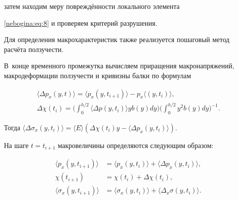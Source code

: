 затем находим меру повреждённости локального элемента

\eqref{nebogina:eq:8} и проверяем критерий разрушения.



Для определения макрохарактеристик также реализуется пошаговый метод расчёта ползучести. 

В~конце временного промежутка вычисляем приращения макронапряжений, макродеформации ползучести и кривизны балки по формулам

\begin{equation} \label{nebogina:eq:21}

\begin{array}{c}

\langle\Delta p_x (y,t)\rangle =\langle p_x ( y, t_{i+1} )\rangle

- p_x\langle ( y , t_i )\rangle, \\[2mm]

\displaystyle

\Delta \chi ( t_i ) = \biggl({ \int _0^{h/2} \langle \Delta p ( y, t_i )\rangle y b( y)

dy}\biggr) \biggl({\int _0^{h/2} y^2 b(y) dy}\biggr)^{-1}.

\end{array}

\end{equation}

Тогда  $\langle \Delta \sigma_x ( y, t_i )\rangle = \langle E \rangle ( \Delta \chi (t_i) y - \langle\Delta p_x ( y, t_i )\rangle )$.



На шаге $t=t_{i+1}$  макровеличины определяются следующим образом:

\begin{equation}\label{nebogina:eq:22}

\begin{aligned}

\langle p_x( y, t_{i+1} )\rangle &= \langle p_x( y, t_i )\rangle + \langle\Delta p_x( y, t_i )\rangle,  \\

\chi ( t_{i+1} )& = \chi ( t_i ) + \Delta \chi ( t_i ), \\

\langle\sigma_x ( y, t_{i+1} )\rangle &= \langle\sigma_x ( y, t_i )

\rangle + \langle \Delta_x \sigma ( y, t_i )\rangle.

\end{aligned}

\end{equation}




